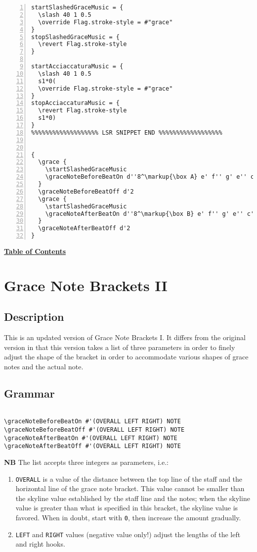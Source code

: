 \begin{Verbatim}[numbers=left,xleftmargin=5mm]
startSlashedGraceMusic = {
  \slash 40 1 0.5
  \override Flag.stroke-style = #"grace"
}
stopSlashedGraceMusic = {
  \revert Flag.stroke-style
}

startAcciaccaturaMusic = {
  \slash 40 1 0.5
  s1*0(
  \override Flag.stroke-style = #"grace"
}
stopAcciaccaturaMusic = {
  \revert Flag.stroke-style
  s1*0)
}
%%%%%%%%%%%%%%%%%%% LSR SNIPPET END %%%%%%%%%%%%%%%%%%


{
  \grace {
    \startSlashedGraceMusic
    \graceNoteBeforeBeatOn d''8^\markup{\box A} e' f'' g' e'' c'
  }
  \graceNoteBeforeBeatOff d'2
  \grace {
    \startSlashedGraceMusic
    \graceNoteAfterBeatOn d''8^\markup{\box B} e' f'' g' e'' c'
  }
  \graceNoteAfterBeatOff d'2
}
\end{Verbatim}

\hyperref[sec:toc]{\textbf{Table of Contents}}

\vfill \break


\label{sec:gracenote2}
\section {Grace Note Brackets II}
\hfill
{}
\hfill

\subsection{Description}
This is an updated version of Grace Note Brackets I. It differs from the original version in that this version takes a list of three parameters in order to finely adjust the shape of the bracket in order to accommodate various shapes of grace notes and the actual note. 

\subsection{Grammar}
\begin{verbatim}

\graceNoteBeforeBeatOn #'(OVERALL LEFT RIGHT) NOTE
\graceNoteBeforeBeatOff #'(OVERALL LEFT RIGHT) NOTE
\graceNoteAfterBeatOn #'(OVERALL LEFT RIGHT) NOTE
\graceNoteAfterBeatOff #'(OVERALL LEFT RIGHT) NOTE
\end{verbatim}
\textbf{NB}
The list accepts three integers as parameters, i.e.:
\begin{enumerate}
\item \verb|OVERALL| is a value of the distance between the top line of the staff and the horizontal line of the grace note bracket. This value cannot be smaller than the skyline value established by the staff line and the notes; when the skyline value is greater than what is specified in this bracket, the skyline value is favored. When in doubt, start with \verb|0|, then increase the amount gradually.
\item \verb|LEFT| and \verb|RIGHT| values (negative value only!)  adjust the lengths of the left and right hooks.   
\end{enumerate}
